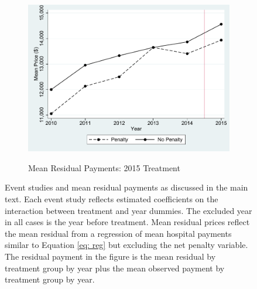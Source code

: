 \documentclass[12pt]{article}
\begin{document}
\begin{figure}[!htb]
\begin{subfigure}{.5\textwidth}
  \label{fig:sfig7}
\end{subfigure}%
\begin{subfigure}{.5\textwidth}
  \centering
  \caption{Mean Residual Payments: 2015 Treatment}
  \includegraphics[width=.8\linewidth]{price_resid_2015.pdf}
  \label{fig:sfig8}
\end{subfigure}
\caption*{\footnotesize{Event studies and mean residual payments as discussed in the main text. Each event study reflects estimated coefficients on the interaction between treatment and year dummies. The excluded year in all cases is the year before treatment. Mean residual prices reflect the mean residual from a regression of mean hospital payments similar to Equation \ref{eq: reg} but excluding the net penalty variable. The residual payment in the figure is the mean residual by treatment group by year plus the mean observed payment by treatment group by year.}}
\end{figure}
\end{document}
